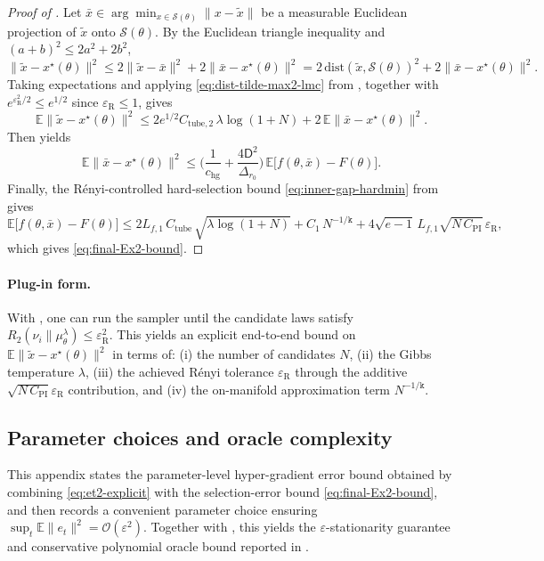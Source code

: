 \documentclass{article}
\theoremstyle{normaltheorem}
\newcommand{\gibbs}{\mu}
\newcommand{\dimk}{\texttt{k}}
\newcommand{\calS}{\mathcal{S}}
\begin{document}
\begin{proof}[Proof of ]
Let \(\bar x\in\arg\min_{x\in\calS(\theta)}\|x-\tilde x\|\) be a measurable Euclidean projection of \(\tilde x\) onto
\(\calS(\theta)\).
By the Euclidean triangle inequality and $(a+b)^2\le 2a^2+2b^2$,
\[
\|\tilde x-x^\star(\theta)\|^2
\le
2\|\tilde x-\bar x\|^2+2\|\bar x-x^\star(\theta)\|^2
=
2\,\mathrm{dist}(\tilde x,\calS(\theta))^2+2\|\bar x-x^\star(\theta)\|^2.
\]
Taking expectations and applying \eqref{eq:dist-tilde-max2-lmc} from , together with
\(e^{\varepsilon_{\mathrm R}^2/2}\le e^{1/2}\) since \(\varepsilon_{\mathrm R}\le1\), gives
\[
\mathbb E\|\tilde x-x^\star(\theta)\|^2
\le
2e^{1/2}C_{\mathrm{tube},2}\,\lambda\log(1+N)
+2\,\mathbb E\|\bar x-x^\star(\theta)\|^2.
\]
Then  yields
\[
\mathbb E\|\bar x-x^\star(\theta)\|^2
\le
\Bigg(\frac{1}{c_{\mathrm{hg}}}+\frac{4\mathsf D^2}{\Delta_{r_0}}\Bigg)\,
\mathbb E\big[f(\theta,\bar x)-F(\theta)\big].
\]
Finally, the R\'enyi-controlled hard-selection bound \eqref{eq:inner-gap-hardmin} from  gives
\[
\mathbb E\big[f(\theta,\bar x)-F(\theta)\big]
\le
2L_{f,1}\,C_{\mathrm{tube}}\,\sqrt{\lambda\log(1+N)}
+C_1\,N^{-1/\dimk}
+4\sqrt{e-1}\,L_{f,1}\sqrt{N\,C_{\mathrm{PI}}}\,\varepsilon_{\mathrm R},
\]
which gives \eqref{eq:final-Ex2-bound}.
\end{proof}

\paragraph{Plug-in form.}
With , one can run the sampler until the candidate laws satisfy
$R_2(\nu_i\|\gibbs_\theta^\lambda)\le \varepsilon_{\mathrm R}^2$.
This yields an explicit end-to-end bound on $\mathbb E\|\tilde x-x^\star(\theta)\|^2$ in terms of:
(i) the number of candidates $N$,
(ii) the Gibbs temperature $\lambda$,
(iii) the achieved R\'enyi tolerance $\varepsilon_{\mathrm R}$ through the additive
\(\sqrt{N\,C_{\mathrm{PI}}}\varepsilon_{\mathrm R}\) contribution,
and (iv) the on-manifold approximation term $N^{-1/\dimk}$.


\subsection{Parameter choices and oracle complexity}\label{append:param-tuning}
This appendix states the parameter-level hyper-gradient error bound obtained by combining \eqref{eq:et2-explicit} with the selection-error bound \eqref{eq:final-Ex2-bound}, and then records a convenient parameter choice ensuring
$\sup_t \mathbb E\|e_t\|^2=\mathcal{O}(\varepsilon^2)$.
Together with , this yields the $\varepsilon$-stationarity guarantee and conservative polynomial oracle bound reported in .
\end{document}
